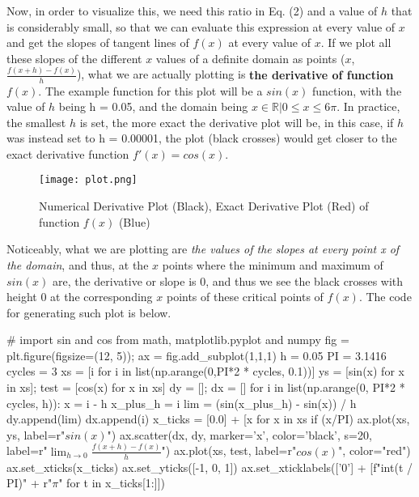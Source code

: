 \documentclass[12pt]{article}
\begin{document}
Now, in order to visualize this, we need this ratio in Eq. (2) and a value of $h$ that is considerably small, so that we can evaluate this expression at every value of $x$ and get the slopes of tangent lines of $f(x)$ at every value of $x$. If we plot all these slopes of the different $x$ values of a definite domain as points ($x$, $\frac{f(x+h) - f(x)}{h}$), what we are actually plotting is \textbf{the derivative of function $f(x)$}. The example function for this plot will be a $sin(x)$ function, with the value of $h$ being h = 0.05, and the domain being ${x \in \mathbb{R} | 0 \leq x \leq 6\pi}$. In practice, the smallest $h$ is set, the more exact the derivative plot will be, in this case, if $h$ was instead set to h = 0.00001, the plot (black crosses) would get closer to the exact derivative function $f'(x) = cos(x)$.

\begin{figure}[ht]
    \centering
    \texttt{[image: plot.png]}
    \caption{Numerical Derivative Plot (Black), Exact Derivative Plot (Red) of function $f(x)$ (Blue)}
    \label{fig:my_label}
\end{figure}

Noticeably, what we are plotting are \textit{the values of the slopes at every point x of the domain}, and thus, at the $x$ points where the minimum and maximum of $sin(x)$ are, the derivative or slope is 0, and thus we see the black crosses with height 0 at the corresponding $x$ points of these critical points of $f(x)$. The code for generating such plot is below.
\\

\begin{python}
# import sin and cos from math, matplotlib.pyplot and numpy
fig = plt.figure(figsize=(12, 5)); ax = fig.add_subplot(1,1,1)
h = 0.05
PI = 3.1416
cycles = 3
xs = [i for i in list(np.arange(0,PI*2 * cycles, 0.1))]
ys = [sin(x) for x in xs]; test = [cos(x) for x in xs]
dy = []; dx = []
for i in list(np.arange(0, PI*2 * cycles, h)):
    x = i - h
    x_plus_h = i
    lim = (sin(x_plus_h) - sin(x)) / h
    dy.append(lim)
    dx.append(i)
x_ticks = [0.0] + [x for x in xs if (x/PI) %
ax.plot(xs, ys, label=r"$sin(x)$")
ax.scatter(dx, dy, marker='x', color='black', s=20, label=r"$\lim_{h\to0} \frac{f(x+h) - f(x)}{h}$")
ax.plot(xs, test, label=r"$cos(x)$", color="red")
ax.set_xticks(x_ticks)
ax.set_yticks([-1, 0, 1])
ax.set_xticklabels(['0'] + [f"{int(t / PI)}" + r"$\pi$" for t in x_ticks[1:]])
\end{python}


 
\end{document}
